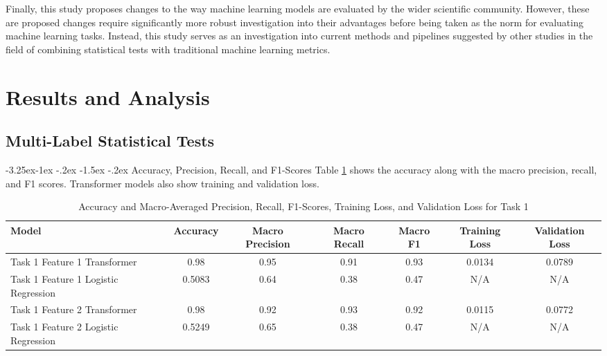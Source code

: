 \documentclass[10.7pt, onecolumn]{article}
\makeatletter
\renewcommand\subsubsection{\@startsection{subsubsection}{3}{\z@}%
	{-3.25ex\@plus -1ex \@minus -.2ex}%
    {-1.5ex \@plus -.2ex}%
    {\normalfont\itshape}}
\makeatother
\begin{document}
Finally, this study proposes changes to the way machine learning models are evaluated by the wider scientific community. However, these are proposed changes require significantly more robust investigation into their advantages before being taken as the norm for evaluating machine learning tasks. Instead, this study serves as an investigation into current methods and pipelines suggested by other studies in the field of combining statistical tests with traditional machine learning metrics.

\section{Results and Analysis}\label{results}

\subsection{Multi-Label Statistical Tests}

\subsubsection{Accuracy, Precision, Recall, and F1-Scores}
Table \ref{tab:task1accEtc} shows the accuracy along with the macro precision, recall, and F1 scores. Transformer models also show training and validation loss.
\begin{table}[h]
  \small
  \centering
  \setlength{\tabcolsep}{4pt}
  \begin{tabular}{|p{3cm}|c|c|c|c|c|c|}
    \hline
    \textbf{Model} & \textbf{Accuracy} & \textbf{Macro Precision} & \textbf{Macro Recall} & \textbf{Macro F1}  & \textbf{Training Loss} & \textbf{Validation Loss}\\
    \hline
    Task 1 Feature 1 Transformer & 0.98  & 0.95  & 0.91  & 0.93 & 0.0134 & 0.0789 \\
    \hline
    Task 1 Feature 1 Logistic Regression & 0.5083 & 0.64  & 0.38  & 0.47 &N/A &N/A \\
    \hline
    Task 1 Feature 2 Transformer & 0.98  & 0.92  & 0.93  & 0.92 &0.0115 &0.0772 \\
    \hline
    Task 1 Feature 2 Logistic Regression & 0.5249 & 0.65  & 0.38  & 0.47 &N/A &N/A \\
    \hline
  \end{tabular}
  \caption{Accuracy and Macro-Averaged Precision, Recall, F1-Scores, Training Loss, and Validation Loss for Task 1}
  \label{tab:task1accEtc}
\end{table}
\end{document}
